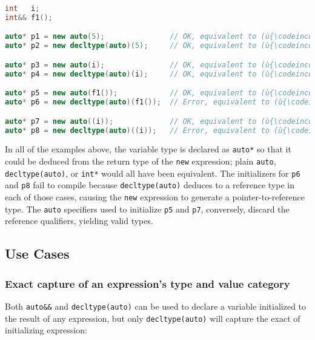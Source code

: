 \begin{lstlisting}[language=C++]
int   i;
int&& f1();

auto* p1 = new auto(5);               // OK, equivalent to (ù{\codeincomments{new int(5)}}ù)
auto* p2 = new decltype(auto)(5);     // OK, equivalent to (ù{\codeincomments{new int(5)}}ù)

auto* p3 = new auto(i);               // OK, equivalent to (ù{\codeincomments{new int(i)}}ù)
auto* p4 = new decltype(auto)(i);     // OK, equivalent to (ù{\codeincomments{new int(i)}}ù)

auto* p5 = new auto(f1());            // OK, equivalent to (ù{\codeincomments{new int(f1())}}ù)
auto* p6 = new decltype(auto)(f1());  // Error, equivalent to (ù{\codeincomments{new int\&\&(f1())}}ù)

auto* p7 = new auto((i));             // OK, equivalent to (ù{\codeincomments{new int(i)}}ù)
auto* p8 = new decltype(auto)((i));   // Error, equivalent to (ù{\codeincomments{new int\&(i)}}ù)
\end{lstlisting}
    

In all of the examples above, the variable type is declared as
\lstinline!auto*! so that it could be deduced from the return type of the
\lstinline!new! expression; plain \lstinline!auto!, \lstinline!decltype(auto)!,
or \lstinline!int*! would all have been equivalent. The initializers for
\lstinline!p6! and \lstinline!p8! fail to compile because
\lstinline!decltype(auto)! deduces to a reference type in each of those
cases, causing the \lstinline!new! expression to generate a
pointer-to-reference type. The \lstinline!auto! specifiers used to
initialize \lstinline!p5! and \lstinline!p7!, conversely, discard the
reference qualifiers, yielding valid types.

\subsection[Use Cases]{Use Cases}\label{use-cases}

\subsubsection[Exact capture of an expression’s type and value category]{Exact capture of an expression’s type and value category}\label{exact-capture-of-an-expression’s-type-and-value-category}

Both \lstinline!auto&&! and \lstinline!decltype(auto)! can be used to
declare a variable initialized to the result of any expression, but only
\lstinline!decltype(auto)! will capture the exact 
of initializing expression:

